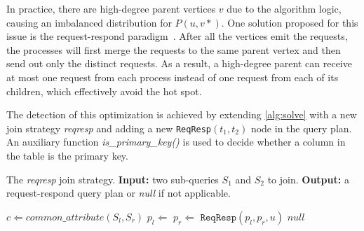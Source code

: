 \documentclass{sokendai_thesis} %
\begin{document}
In practice, there are high-degree parent vertices $v$ due to the algorithm logic, causing an imbalanced distribution for $P(u, v*)$.
One solution proposed for this issue is the request-respond paradigm~\cite{yan2015effective}.
After all the vertices emit the requests, the processes will first merge the requests to the same parent vertex and then send out only the distinct requests.
As a result, a high-degree parent can receive at most one request from each process instead of one request from each of its children, which effectively avoid the hot spot.


The detection of this optimization is achieved by extending \autoref{alg:solve} with a new join strategy \textit{reqresp} and adding a new \texttt{ReqResp}$(t_1,t_2)$ node in the query plan.
An auxiliary function \textit{is\_primary\_key()} is used to decide whether a column in the table is the primary key.

\begin{algorithm}[t] %
\caption{The \textit{reqresp} join strategy. \textbf{Input:} two sub-queries $S_1$ and $S_2$ to join. \textbf{Output:} a request-respond query plan or \textit{null} if not applicable.}
\label{alg:solve2} %
\begin{algorithmic} %
  \State{}
    \State $c \Leftarrow \textit{common\_attribute}(S_l, S_r)$
        \State $p_l \Leftarrow$ 
        \State $p_r \Leftarrow$ 
        \State \Return $\texttt{ReqResp}(p_l, p_r, u)$
      \EndFor
    \EndIf
    \State\Return $\textit{null}$
  \EndProcedure
\end{algorithmic}
\end{algorithm}
\end{document}
